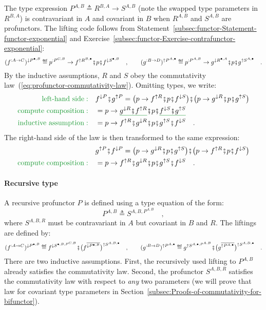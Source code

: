 The type expression $P^{A,B}\triangleq R^{B,A}\rightarrow S^{A,B}$
(note the swapped type parameters in $R^{B,A}$) is contravariant
in $A$ and covariant in $B$ when $R^{A,B}$ and $S^{A,B}$ are profunctors.
The lifting code follows from Statement~\ref{subsec:functor-Statement-functor-exponential}
and Exercise~\ref{subsec:functor-Exercise-contrafunctor-exponential}:
\[
(f^{:A\rightarrow C})^{\downarrow P^{\bullet,B}}\triangleq p^{:P^{C,B}}\rightarrow f^{\uparrow R^{B,\bullet}}\bef p\bef f^{\downarrow S^{\bullet,B}}\quad,\quad\quad(g^{:B\rightarrow D})^{\uparrow P^{A,\bullet}}\triangleq p^{:P^{A,B}}\rightarrow g^{\downarrow R^{\bullet,A}}\bef p\bef g^{\uparrow S^{A,\bullet}}\quad.
\]
By the inductive assumptions, $R$ and $S$ obey the commutativity
law~(\ref{eq:profunctor-commutativity-law}). Omitting types, we
write:
\begin{align*}
{\color{greenunder}\text{left-hand side}:}\quad & f^{\downarrow P}\bef g^{\uparrow P}=\big(p\rightarrow f^{\uparrow R}\bef p\bef f^{\downarrow S}\big)\bef\big(p\rightarrow g^{\downarrow R}\bef p\bef g^{\uparrow S}\big)\\
{\color{greenunder}\text{compute composition}:}\quad & =p\rightarrow\gunderline{g^{\downarrow R}\bef f^{\uparrow R}}\bef p\bef\gunderline{f^{\downarrow S}\bef g^{\uparrow S}}\\
{\color{greenunder}\text{inductive assumption}:}\quad & =p\rightarrow f^{\uparrow R}\bef g^{\downarrow R}\bef p\bef g^{\uparrow S}\bef f^{\downarrow S}\quad.
\end{align*}
The right-hand side of the law is then transformed to the same expression:
\begin{align*}
 & g^{\uparrow P}\bef f^{\downarrow P}=\big(p\rightarrow g^{\downarrow R}\bef p\bef g^{\uparrow S}\big)\bef\big(p\rightarrow f^{\uparrow R}\bef p\bef f^{\downarrow S}\big)\\
{\color{greenunder}\text{compute composition}:}\quad & =p\rightarrow f^{\uparrow R}\bef g^{\downarrow R}\bef p\bef g^{\uparrow S}\bef f^{\downarrow S}\quad.
\end{align*}


\paragraph{Recursive type}

A recursive profunctor $P$ is defined using a type equation of the
form:
\[
P^{A,B}\triangleq S^{A,B,P^{A,B}}\quad,
\]
where $S^{A,B,R}$ must be contravariant in $A$ but covariant in
$B$ and $R$. The liftings are defined by:
\[
(f^{:A\rightarrow C})^{\downarrow P^{\bullet,B}}\triangleq f^{\downarrow S^{\bullet,B,P^{C,B}}}\bef\big(f^{\overline{\downarrow P^{\bullet,B}}}\big)^{\uparrow S^{A,B,\bullet}}\quad,\quad\quad(g^{:B\rightarrow D})^{\uparrow P^{A,\bullet}}\triangleq g^{\uparrow S^{A,\bullet,P^{A,B}}}\bef\big(g^{\overline{\uparrow P^{A,\bullet}}}\big)^{\uparrow S^{A,D,\bullet}}\quad.
\]
There are two inductive assumptions. First, the recursively used lifting
to $P^{A,B}$ already satisfies the commutativity law. Second, the
profunctor $S^{A,B,R}$ satisfies the commutativity law with respect
to \emph{any} two parameters (we will prove that law for covariant
type parameters in Section~\ref{subsec:Proofs-of-commutativity-for-bifunctor}).

